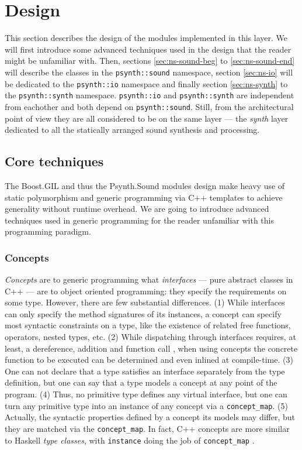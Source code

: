 \section{Design}

This section describes the design of
the modules implemented in this layer. We will first introduce some
advanced techniques used in the design that the reader might be
unfamiliar with. Then, sections \ref{sec:ns-sound-beg} to
\ref{sec:ns-sound-end} will describe the classes in the
\texttt{psynth::sound} namespace, section \ref{sec:ns-io} will be
dedicated to the \texttt{psynth::io} namespace and finally section
\ref{sec:ns-synth} to the \texttt{psynth::synth}
namespace. \texttt{psynth::io} and \texttt{psynth::synth} are
independent from eachother and both depend on
\texttt{psynth::sound}. Still, from the architectural point of view
they are all considered to be on the same layer --- the \emph{synth}
layer dedicated to all the statically arranged sound synthesis and
processing.

\subsection{Core techniques}

The Boost.GIL and thus the Psynth.Sound modules design make heavy use
of static polymorphism and generic
programming via C++ templates to achieve generality without runtime
overhead. We are going to introduce advanced techniques used in
generic programming for the reader unfamiliar with this programming
paradigm.

\subsubsection{Concepts}
\label{sec:concepts}

\emph{Concepts}
\cite{jarvi10concept} are to generic programming what
\emph{interfaces} --- pure abstract classes in C++ --- are to object
oriented programming: they specify the requirements on some
type. However, there are few substantial differences. (1) While
interfaces can only specify the method signatures of its instances, a
concept can specify most syntactic constraints on a type, like the
existence of related free functions, operators, nested types, etc. (2)
While dispatching through interfaces requires, at least, a
dereference, addition and function call \cite{driesen96direct}, when
using concepts the concrete function to be executed can be determined
and even inlined at compile-time. (3) One can not declare that a type
satisfies an interface separately from the type definition, but one
can say that a type models a concept at any point of the program. (4)
Thus, no primitive type defines any virtual interface, but one can
turn any primitive type into an instance of any concept via a
\texttt{concept\_map}. (5) Actually, the syntactic
properties defined by a concept its models may differ, but they are
matched via the \texttt{concept\_map}. In fact, C++ concepts are more
similar to Haskell \emph{type classes}, with
\texttt{instance} doing the job of \texttt{concept\_map}
\cite{bernardy08comparison}.


